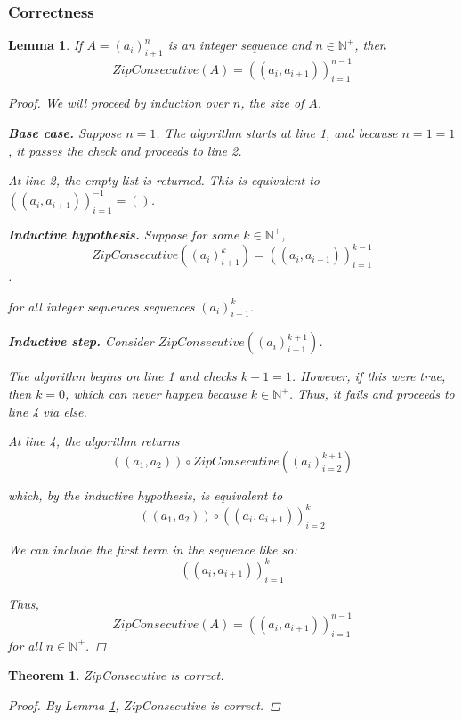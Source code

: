 \documentclass{article}
\newtheorem{theorem}{Theorem}
\newtheorem{lemma}{Lemma}
\theoremstyle{definition}
\begin{document}
\subsubsection{Correctness}
\begin{lemma}
    If $A = (a_i)^n_{i+1}$ is an integer sequence and $n \in \mathbb{N}^+$, then 
    $$ZipConsecutive(A) = \left((a_i, a_{i+1})\right)^{n-1}_{i=1}$$
    \label{lem:zipcons}
    \begin{proof}
        We will proceed by induction over $n$, the size of $A$.
        
        \textbf{Base case.} Suppose $n = 1$. The algorithm starts at line 1, and because $n = 1 = 1$, it passes the check and proceeds to line 2.

        At line 2, the empty list is returned. This is equivalent to $\left((a_i, a_{i+1})\right)^{-1}_{i=1} = ()$.

        \textbf{Inductive hypothesis.} Suppose for some $k \in \mathbb{N}^+$, 
        $$ZipConsecutive((a_i)^k_{i+1}) = \left((a_i, a_{i+1})\right)^{k-1}_{i=1}$$.

        for all integer sequences sequences $(a_i)^k_{i+1}$.

        \textbf{Inductive step.} Consider $ZipConsecutive((a_i)^{k+1}_{i+1})$. 
        
        The algorithm begins on line 1 and checks $k + 1 = 1$. However, if this were true, then $k = 0$, which can never happen because $k \in \mathbb{N}^+$. Thus, it fails and proceeds to line 4 via else.

        At line 4, the algorithm returns 
        $$((a_1, a_2)) \circ ZipConsecutive((a_i)^{k+1}_{i=2})$$

        which, by the inductive hypothesis, is equivalent to 
        $$((a_1, a_2)) \circ ((a_i, a_{i+1}))^{k}_{i=2}$$

        We can include the first term in the sequence like so:
        $$((a_i, a_{i+1}))^{k}_{i=1}$$

        Thus,
        $$ZipConsecutive(A) = \left((a_i, a_{i+1})\right)^{n-1}_{i=1}$$
        for all $n \in \mathbb{N}^+$.
    \end{proof}
\end{lemma}

\begin{theorem}
    ZipConsecutive is correct.
    \begin{proof}
        By Lemma \ref{lem:zipcons}, ZipConsecutive is correct.
    \end{proof}
\end{theorem}
\end{document}
